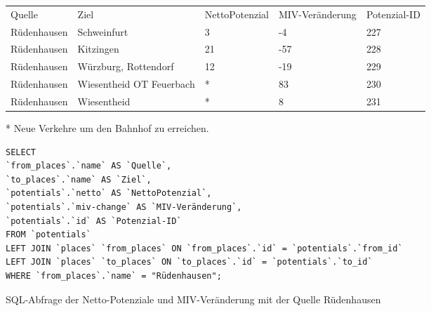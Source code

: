 \begin{tabularx}{\textwidth}{*5{X}}
Quelle & Ziel & NettoPotenzial & MIV-Veränderung & Potenzial-ID\\ 
Rüdenhausen & Schweinfurt & 3 & -4 & 227\\ 
Rüdenhausen & Kitzingen & 21 & -57 & 228\\ 
Rüdenhausen & Würzburg, Rottendorf & 12 & -19 & 229\\ 
Rüdenhausen & Wiesentheid OT Feuerbach & * & 83 & 230\\ 
Rüdenhausen & Wiesentheid & * & 8 & 231\\ 
\end{tabularx}
\newline
\newline
* Neue Verkehre um den Bahnhof zu erreichen.
\newline
\begin{listing}[htbp]
\begin{verbatim}
SELECT
`from_places`.`name` AS `Quelle`, 
`to_places`.`name` AS `Ziel`, 
`potentials`.`netto` AS `NettoPotenzial`, 
`potentials`.`miv-change` AS `MIV-Veränderung`, 
`potentials`.`id` AS `Potenzial-ID`
FROM `potentials`
LEFT JOIN `places` `from_places` ON `from_places`.`id` = `potentials`.`from_id`
LEFT JOIN `places` `to_places` ON `to_places`.`id` = `potentials`.`to_id`
WHERE `from_places`.`name` = "Rüdenhausen";
\end{verbatim}
\caption{SQL-Abfrage der Netto-Potenziale und MIV-Veränderung mit der Quelle Rüdenhausen}\label{lst-fz-ruedenhausen}
\end{listing}